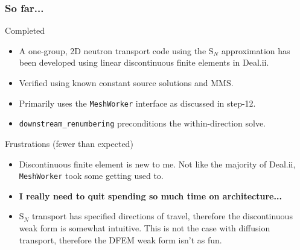\documentclass[xcolor={usenames,dvipsnames,svgnames,table}]{beamer}
\begin{document}

\begin{frame}\frametitle{So far...}
	\begin{block}{Completed}
		\begin{itemize}
			\item A one-group, 2D neutron transport code using the S$_N$ approximation has been developed using linear discontinuous finite elements in Deal.ii.
			\item Verified using known constant source solutions and MMS.
			\item Primarily uses the \texttt{MeshWorker} interface as discussed in step-12.
			\item \texttt{downstream\_renumbering} preconditions the within-direction solve.
		\end{itemize}
	\end{block}
	\begin{block}{Frustrations \tiny{(fewer than expected)}}
		\begin{itemize}
			\item Discontinuous finite element is new to me. Not like the majority of Deal.ii, \texttt{MeshWorker} took some getting used to.
			\item \textbf{I really need to quit spending so much time on architecture...}
			\item S$_N$ transport has specified directions of travel, therefore the discontinuous weak form is somewhat intuitive. This is not the case with diffusion transport, therefore the DFEM weak form isn't as fun.
		\end{itemize}
	\end{block}
\end{frame}

\end{document}

